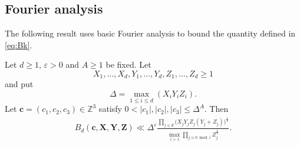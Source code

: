 \subsection{Fourier analysis}\label{s:fourier}

The following result uses basic Fourier analysis to bound the
quantity
defined in \eqref{eq:Bk}.

\begin{proposition}\label{prop:boundingsolutions}
Let $d\geq 1$, $\varepsilon>0$ and $A\geq 1$ be fixed.
Let $$
X_1,\ldots, X_d, Y_1,\ldots, Y_d,Z_1,\ldots, Z_d\geq 1
$$
and put
\begin{equation}\label{eq:Delta}
\Delta =\max_{1\leq i\leq d}(X_iY_iZ_i).
\end{equation}
Let  $\mathbf{c}=(c_1,c_2,c_3)\in \mathbb{Z}^3$ satisfy $0<|c_1|,|c_2|,|c_3|\leq \Delta^A$.
Then
\begin{align*}
B_d(\mathbf{c},\mathbf{X},\mathbf{Y},\mathbf{Z})   \ll
\Delta^\varepsilon \frac{\prod_{j\leq d} \big(X_jY_jZ_j(Y_j+Z_j)\big)^{\frac{1}{2}}}{\max_{i>1}\prod_{j\equiv 0\bmod i}Z_j^{\frac{1}{2}}}.
\end{align*}
\end{proposition}

